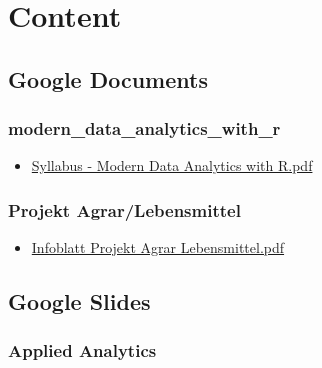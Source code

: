 \documentclass[
  letterpaper,
  DIV=11]{scrartcl}
\author{}
\date{}
\providecommand{\tightlist}{%
  \setlength{\itemsep}{0pt}\setlength{\parskip}{0pt}}\usepackage{longtable,booktabs,array}
\begin{document}
\section{Content}\label{content}

\subsection{Google Documents}\label{google-documents}

\subsubsection{modern\_data\_analytics\_with\_r}\label{modern_data_analytics_with_r}

\begin{itemize}
\tightlist
\item
  \href{google_documents/modern_data_analytics_with_r/Syllabus\%20-\%20Modern\%20Data\%20Analytics\%20with\%20R.pdf}{Syllabus
  - Modern Data Analytics with R.pdf}
\end{itemize}

\subsubsection{Projekt
Agrar/Lebensmittel}\label{projekt-agrarlebensmittel}

\begin{itemize}
\tightlist
\item
  \href{google_documents/projekt_agrar_lebensmittel/Infoblatt\%20Projekt\%20Agrar\%20Lebensmittel.pdf}{Infoblatt
  Projekt Agrar Lebensmittel.pdf}
\end{itemize}

\subsection{Google Slides}\label{google-slides}

\subsubsection{Applied Analytics}\label{applied-analytics}
\end{document}

